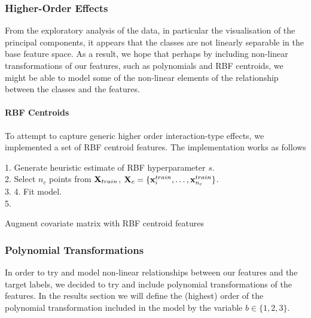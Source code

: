 \subsubsection{Higher-Order Effects}
From the exploratory analysis of the data, in particular the visualisation of the principal components, it appears that the classes are not linearly separable in the base feature space. As a result, we hope that perhaps by including non-linear transformations of our features, such as polynomials and RBF centroids, we might be able to model some of the non-linear elements of the relationship between the classes and the features.

\paragraph{RBF Centroids}
To attempt to capture generic higher order interaction-type effects, we implemented a set of RBF centroid features. The implementation works as follows \newline
\begin{algorithm}[H]
    1. Generate heuristic estimate of RBF hyperparameter $s$.\\
    2. Select $n_c$ points from $\mathbf{X}_{train}$, $\mathbf{X}_c = \{\mathbf{x}^{train}_i, \dots, \mathbf{x}^{train}_{n_c}\}$.\\
    3.  
    4. Fit model.\\
    5. 
    \caption{Augment covariate matrix with RBF centroid features}
\end{algorithm}

\subsubsection{Polynomial Transformations}
In order to try and model non-linear relationships between our features and the target labels, we decided to try and include polynomial transformations of the features. In the results section we will define the (highest) order of the polynomial transformation included in the model by the variable $b \in \{1,2,3\}$.

